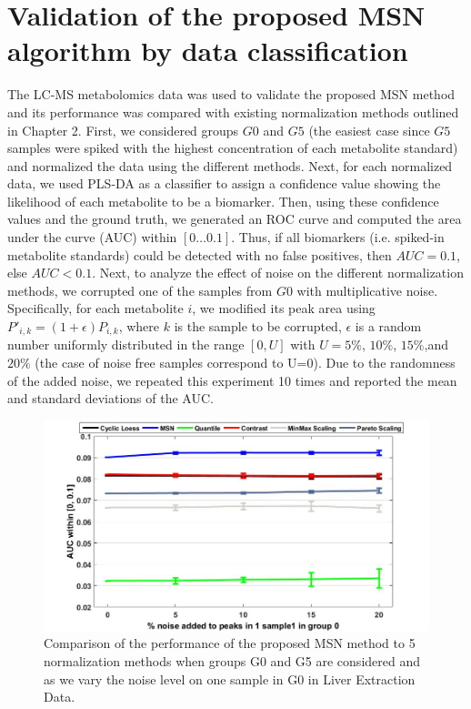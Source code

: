 \section{Validation of the proposed MSN algorithm by data classification}


The LC-MS metabolomics data was used to validate the proposed MSN method and its performance was compared with existing normalization methods outlined in Chapter 2. First, we considered groups $G0$ and $G5$ (the easiest case since $G5$ samples were spiked with the highest concentration of each metabolite standard) and normalized the data using the different methods. Next, for each normalized data, we used PLS-DA as a classifier to assign a confidence value showing the likelihood of each metabolite to be a biomarker. Then, using these confidence values and the ground truth, we generated an ROC curve and computed the area under the curve (AUC) within $[0 \ldots 0.1]$. Thus, if all biomarkers (i.e. spiked-in metabolite standards) could be detected with no false positives, then $AUC = 0.1$, else $AUC < 0.1$. Next, to analyze the effect of noise on the different normalization methods, we corrupted one of the samples from $G0$ with multiplicative noise. Specifically, for each metabolite $i$, we modified its peak area using $P'_{i,k}=(1+ \epsilon )P_{i,k}$, where $k$ is the sample to be corrupted, $\epsilon$ is a random number uniformly distributed in the range $[0,U]$ with $U=5\%$, $10 \%$, $15 \% $,and $20 \% $ (the case of noise free samples correspond to U=0). Due to the randomness of the added noise, we repeated this experiment 10 times and reported the mean and standard deviations of the AUC. 

\begin{figure}
	
	\centering
	\includegraphics[width=1\textwidth]{ErrorBar_PLSDA_s3}
	\caption{Comparison of the performance of the proposed MSN method to 5 normalization methods when groups G0 and G5 are considered and as we vary the noise level on one sample in G0 in Liver Extraction Data.}
	\label{ErrorBar_PLSDA_s3}
\end{figure}


